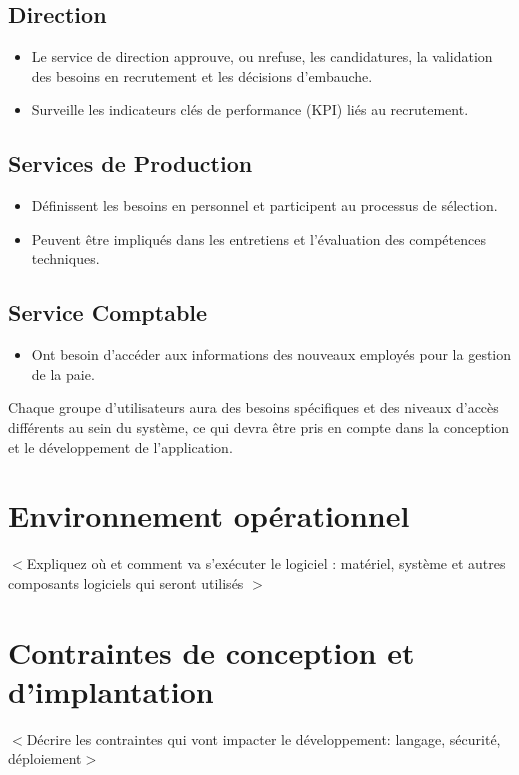 \documentclass{scrreprt}
\begin{document}
\subsection{Direction}
\begin{itemize}
    \item Le service de direction approuve, ou nrefuse, les candidatures, la validation des besoins en recrutement et les décisions d'embauche.
    \item Surveille les indicateurs clés de performance (KPI) liés au recrutement.
\end{itemize}

\subsection{Services de Production}
\begin{itemize}
    \item Définissent les besoins en personnel et participent au processus de sélection.
    \item Peuvent être impliqués dans les entretiens et l'évaluation des compétences techniques.
\end{itemize}

\subsection{Service Comptable}
\begin{itemize}
    \item  Ont besoin d'accéder aux informations des nouveaux employés pour la gestion de la paie.
\end{itemize}



Chaque groupe d'utilisateurs aura des besoins spécifiques et des niveaux d'accès différents au sein du système, ce qui devra être pris en compte dans la conception et le développement de l'application.

\section{Environnement opérationnel}
$<$Expliquez où et comment va s'exécuter le logiciel : matériel, système et autres composants logiciels qui seront utilisés $>$

\section{Contraintes de conception et d'implantation}
$<$Décrire les contraintes qui vont impacter le développement: langage, sécurité, déploiement$>$
\end{document}
